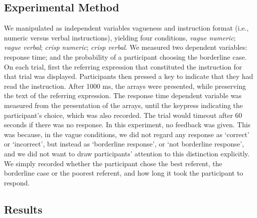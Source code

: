 \documentclass[%
man,		%
floatsintext,%
apacite%
]{apa6}
\begin{document}
\subsection{Experimental Method} %
We manipulated as independent variables vagueness and instruction format (i.e., numeric versus verbal instructions), yielding four conditions, \emph{vague numeric}; \emph{vague verbal}; \emph{crisp numeric}; \emph{crisp verbal}.
We measured two dependent variables: response time; and the probability of a participant choosing the borderline case.
On each trial, first the referring expression that constituted the instruction for that trial was displayed. 
Participants then pressed a key to indicate that they had read the instruction. 
After 1000 ms, the arrays were presented, while preserving the text of the referring expression. 
The response time dependent variable was measured from the presentation of the arrays, until the keypress indicating the participant's choice, which was also recorded. 
The trial would timeout after 60 seconds if there was no response.
In this experiment, no feedback was given. 
This was because, in the vague conditions, we did not regard any response as `correct' or `incorrect', but instead as `borderline response', or `not borderline response', and we did not want to draw participants' attention to this distinction explicitly. 
We simply recorded whether the participant chose the best referent, the borderline case or the poorest referent, and how long it took the participant to respond.

\subsection{Results} %
\end{document}
